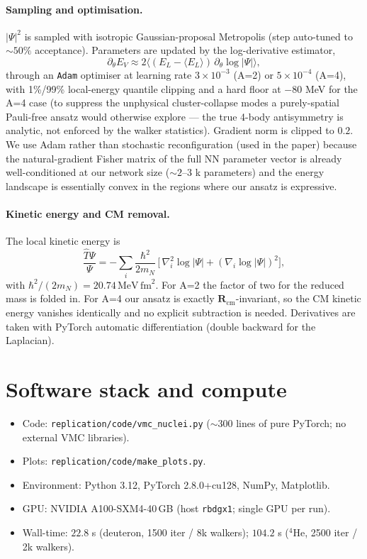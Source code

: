 \documentclass[11pt]{article}
\begin{document}
\paragraph{Sampling and optimisation.} $|\Psi|^{2}$ is sampled with isotropic
Gaussian-proposal Metropolis (step auto-tuned to $\sim\!50\%$ acceptance).
Parameters are updated by the log-derivative estimator,
\begin{equation}
  \partial_{\theta}E_{V} \approx
  2\big\langle(E_{L}-\langle E_{L}\rangle)\,\partial_{\theta}\log|\Psi|\big\rangle,
\end{equation}
through an \texttt{Adam} optimiser at learning rate $3{\times}10^{-3}$ (A=2) or
$5{\times}10^{-4}$ (A=4), with 1\%/99\% local-energy quantile clipping and a
hard floor at $-80$ MeV for the A=4 case (to suppress the unphysical
cluster-collapse modes a purely-spatial Pauli-free ansatz would otherwise
explore --- the true 4-body antisymmetry is analytic, not enforced by the
walker statistics). Gradient norm is clipped to $0.2$. We use Adam rather than
stochastic reconfiguration (used in the paper) because the natural-gradient
Fisher matrix of the full NN parameter vector is already well-conditioned at
our network size ($\sim\!2$--$3$ k parameters) and the energy landscape is
essentially convex in the regions where our ansatz is expressive.

\paragraph{Kinetic energy and CM removal.} The local kinetic energy is
\begin{equation}
  \frac{\hat T\Psi}{\Psi} =
    -\sum_{i}\frac{\hbar^{2}}{2m_{N}}\,\Big[\,\nabla_{i}^{2}\log|\Psi| +
      (\nabla_{i}\log|\Psi|)^{2}\Big],
\end{equation}
with $\hbar^{2}/(2m_{N})=20.74\,\mathrm{MeV\,fm}^{2}$. For A=2 the factor of
two for the reduced mass is folded in. For A=4 our ansatz is exactly
$\mathbf R_{\mathrm{cm}}$-invariant, so the CM kinetic energy vanishes
identically and no explicit subtraction is needed. Derivatives are taken with
PyTorch automatic differentiation (double backward for the Laplacian).

\section{Software stack and compute}

\begin{itemize}\itemsep 1pt
  \item Code: \texttt{replication/code/vmc\_nuclei.py} ($\sim\!300$ lines of
    pure PyTorch; no external VMC libraries).
  \item Plots: \texttt{replication/code/make\_plots.py}.
  \item Environment: Python 3.12, PyTorch 2.8.0+cu128, NumPy, Matplotlib.
  \item GPU: NVIDIA A100-SXM4-40\,GB (host \texttt{rbdgx1}; single GPU per run).
  \item Wall-time: $22.8$ s (deuteron, 1500 iter / 8k walkers);
                   $104.2$ s ($^{4}$He, 2500 iter / 2k walkers).
\end{itemize}
\end{document}
